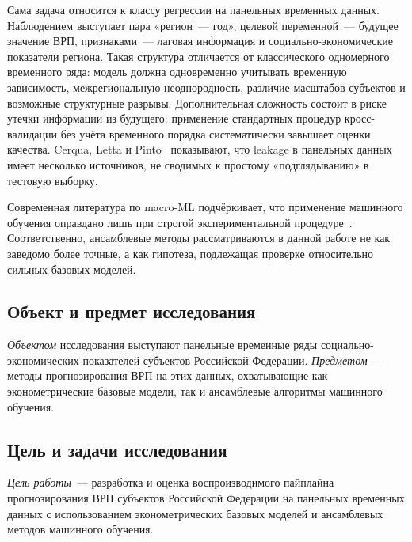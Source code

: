\documentclass[12pt,a4paper]{article}
\begin{document}
Сама задача относится к классу регрессии на панельных временных данных.
Наблюдением выступает пара «регион~--- год», целевой переменной~--- будущее
значение ВРП, признаками~--- лаговая информация и социально-экономические
показатели региона. Такая структура отличается от классического одномерного
временного ряда: модель должна одновременно учитывать временну\'{ю} зависимость,
межрегиональную неоднородность, различие масштабов субъектов и возможные
структурные разрывы. Дополнительная сложность состоит в риске утечки
информации из будущего: применение стандартных процедур кросс-валидации
без учёта временного порядка систематически завышает оценки качества.
Cerqua, Letta и Pinto~\cite{cerqua2025} показывают, что leakage в панельных
данных имеет несколько источников, не сводимых к простому «подглядыванию»
в тестовую выборку.

Современная литература по macro-ML подчёркивает, что применение машинного
обучения оправдано лишь при строгой экспериментальной процедуре~\cite{chi2025}.
Соответственно, ансамблевые методы рассматриваются в данной работе не как
заведомо более точные, а как гипотеза, подлежащая проверке относительно
сильных базовых моделей.

\subsection{Объект и предмет исследования}

\textit{Объектом} исследования выступают панельные временные ряды
социально-экономических показателей субъектов Российской Федерации.
\textit{Предметом}~--- методы прогнозирования ВРП на этих данных,
охватывающие как эконометрические базовые модели, так и ансамблевые
алгоритмы машинного обучения.

\subsection{Цель и задачи исследования}

\textit{Цель работы}~--- разработка и оценка воспроизводимого пайплайна
прогнозирования ВРП субъектов Российской Федерации на панельных временных
данных с использованием эконометрических базовых моделей и ансамблевых
методов машинного обучения.
\end{document}
